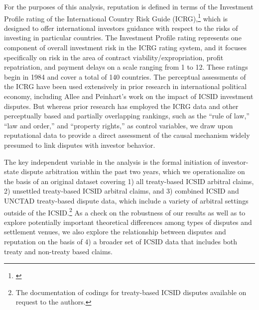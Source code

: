 \documentclass[12pt,onesided]{amsart}
\begin{document}
For the purposes of this analysis, reputation is defined in terms of the Investment Profile rating of the International Country Risk Guide (ICRG),\footnote{\citet{prs:2013}} which is designed to offer international investors guidance with respect to the risks of investing in particular countries. The Investment Profile rating represents one component of overall investment risk in the ICRG rating system, and it focuses specifically on risk in the area of contract viability/expropriation, profit repatriation, and payment delays on a scale ranging from 1 to 12. These ratings begin in 1984 and cover a total of 140 countries. The perceptual assessments of the ICRG have been used extensively in prior research in international political economy, including Allee and Peinhart's work on the impact of ICSID investment disputes. But whereas prior research has employed the ICRG data and other perceptually based and partially overlapping rankings, such as the ``rule of law,'' ``law and order,'' and ``property rights,'' as control variables, we draw upon reputational data to provide a direct assessment of the causal mechanism widely presumed to link disputes with investor behavior.

The key independent variable in the analysis is the formal initiation of investor-state dispute arbitration within the past two years, which we operationalize on the basis of an original dataset covering 1) all treaty-based ICSID arbitral claims, 2) unsettled treaty-based ICSID arbitral claims, and 3) combined ICSID and UNCTAD treaty-based dispute data, which include a variety of arbitral settings outside of the ICSID.\footnote{The documentation of codings for treaty-based ICSID disputes available on request to the authors.} As a check on the robustness of our results as well as to explore potentially important theoretical differences among types of disputes and settlement venues, we also explore the relationship between disputes and reputation on the basis of 4) a broader set of ICSID data that includes both treaty and non-treaty based claims.
\end{document}
